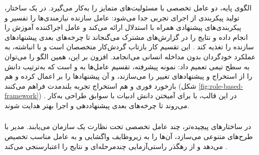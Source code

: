الگوی پایه، دو عامل تخصصی با مسئولیت‌های متمایز را به‌کار می‌گیرد. در یک ساختار، تولید پیکربندی از اجرای تجربی جدا می‌شود: عامل سازنده نیازمندی‌ها را تفسیر و پیکربندی‌های پیشنهادی همراه با استدلال ارائه می‌کند و عامل اجراکننده آموزش را انجام داده و نتایج را در گزارش‌های مشترک می‌گنجاند تا چرخه‌های بعدی پیشنهادهای سازنده را تغذیه کند \cite{liu2025agenthpo}. این تقسیم کار بازتاب گردش‌کار متخصصان است و با  انباشته، به عملکرد خودگردان بدون مداخله انسانی می‌انجامد. افزون بر این، همین الگو را می‌توان به سطح تیمی تعمیم داد: نمونه پیشرفته، تقسیم عامل‌ها به  و  است که به‌ترتیب دانش را از  استخراج و پیشنهادهای تغییر را می‌سازند، و آن پیشنهادها را بر  اعمال کرده و هم بازخورد فوری و هم استخراج تجربه بلندمدت فراهم می‌کنند (شکل \ref{fig:role-based-framework}) \cite{Yang2025NADER}. در این قالب،  با  برای آمیختن دانش ادبیات با سوابق طراحی به‌کار می‌روند تا چرخه‌های بعدی پیشنهاددهی و اجرا بهتر هدایت شوند.

\subsubsection{\protect{}}
در ساختارهای پیچیده‌تر، چند عامل تخصصی تحت نظارت یک  سازمان می‌یابند. مدیر با  طرح‌های متنوعی می‌سازد، آن‌ها را به زیروظایف  واگشایی و به عامل مناسب تخصیص می‌دهد و از رهگذر راستی‌آزمایی چندمرحله‌ای و  نتایج را اعتبارسنجی می‌کند \cite{trirat2025automlagent}.
